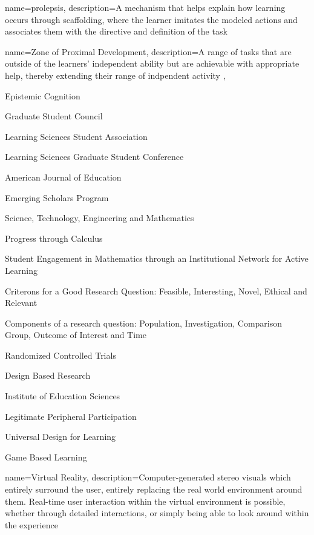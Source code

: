 {
	name={prolepsis},
	description={A mechanism that helps explain how learning occurs through scaffolding, where the learner imitates the modeled actions and associates them with the directive and definition of the task \parencite{reiser_scaffolding_2014}}
}


{
	name={Zone of Proximal Development},
	description={A range of tasks that are outside of the learners' independent ability but are achievable with appropriate help, thereby extending their range of indpendent activity \parencite{reiser_scaffolding_2014}},
}



{Epistemic Cognition}

{Graduate Student Council}

{Learning Sciences Student Association}

{Learning Sciences Graduate Student Conference}

{American Journal of Education}

{Emerging Scholars Program}

{Science, Technology, Engineering and Mathematics}

{Progress through Calculus}

{Student Engagement in Mathematics through an Institutional Network for Active Learning}

{Criterons for a Good Research Question: Feasible, Interesting, Novel, Ethical and Relevant}

{Components of a research question: Population, Investigation, Comparison Group, Outcome of Interest and Time}

{Randomized Controlled Trials}

{Design Based Research}

{Institute of Education Sciences}

{Legitimate Peripheral Participation}

{Universal Design for Learning} 

{Game Based Learning}

{
	name={Virtual Reality},
	description={Computer-generated stereo visuals which entirely surround the user, entirely replacing the real world environment around them. Real-time user interaction within the virtual environment is possible, whether through detailed interactions, or simply being able to look around within the experience \parencite{noauthor_what_2019} }
}


